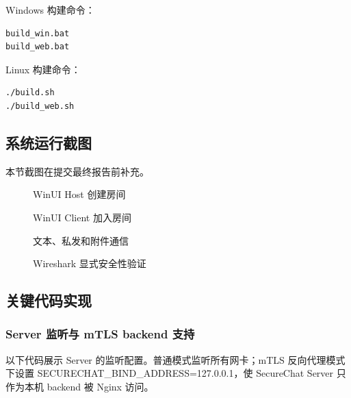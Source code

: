 \documentclass[UTF8,a4paper,12pt]{ctexart}
\begin{document}
Windows 构建命令：

\begin{lstlisting}[language=bash]
build_win.bat
build_web.bat
\end{lstlisting}

Linux 构建命令：

\begin{lstlisting}[language=bash]
./build.sh
./build_web.sh
\end{lstlisting}

\subsection{系统运行截图}

本节截图在提交最终报告前补充。

\begin{figure}[H]
\centering
{}
\caption{WinUI Host 创建房间}
\end{figure}

\begin{figure}[H]
\centering
{}
\caption{WinUI Client 加入房间}
\end{figure}

\begin{figure}[H]
\centering
{}
\caption{文本、私发和附件通信}
\end{figure}

\begin{figure}[H]
\centering
{}
\caption{Wireshark 显式安全性验证}
\end{figure}

\subsection{关键代码实现}

\subsubsection{Server 监听与 mTLS backend 支持}

以下代码展示 Server 的监听配置。普通模式监听所有网卡；mTLS 反向代理模式下设置 SECURECHAT\_BIND\_ADDRESS=127.0.0.1，使 SecureChat Server 只作为本机 backend 被 Nginx 访问。
\end{document}
